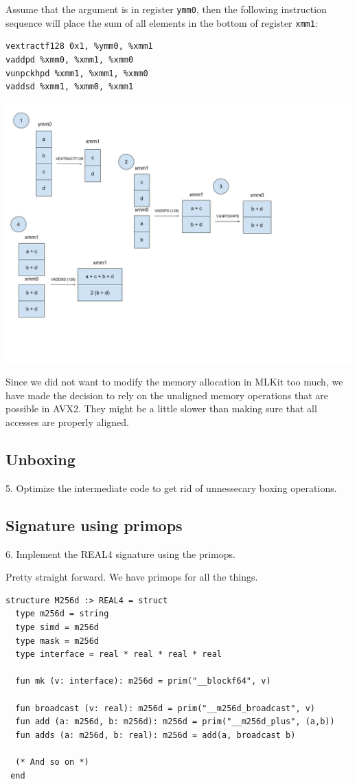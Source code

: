\documentclass{article}
\begin{document}
Assume that the argument is in register \verb!ymm0!, then the following instruction sequence will place the sum of all elements in the bottom of register \verb!xmm1!:

\begin{verbatim}
vextractf128 0x1, %ymm0, %xmm1
vaddpd %xmm0, %xmm1, %xmm0
vunpckhpd %xmm1, %xmm1, %xmm0
vaddsd %xmm1, %xmm0, %xmm1
\end{verbatim}

\includegraphics[width=\textwidth]{sum.png}


Since we did not want to modify the memory allocation in MLKit too much, we have made the decision to rely on the unaligned memory operations that are possible in AVX2. They might be a little slower than making sure that all accesses are properly aligned.

\subsection{Unboxing}
5. Optimize the intermediate code to get rid of unnessecary boxing operations.

\subsection{Signature using primops}

6. Implement the REAL4 signature using the primops.

Pretty straight forward. We have primops for all the things.
\begin{lstlisting}[frame=single]
structure M256d :> REAL4 = struct
  type m256d = string
  type simd = m256d
  type mask = m256d
  type interface = real * real * real * real

  fun mk (v: interface): m256d = prim("__blockf64", v)

  fun broadcast (v: real): m256d = prim("__m256d_broadcast", v)
  fun add (a: m256d, b: m256d): m256d = prim("__m256d_plus", (a,b))
  fun adds (a: m256d, b: real): m256d = add(a, broadcast b)

  (* And so on *)
 end
\end{lstlisting}
\end{document}
